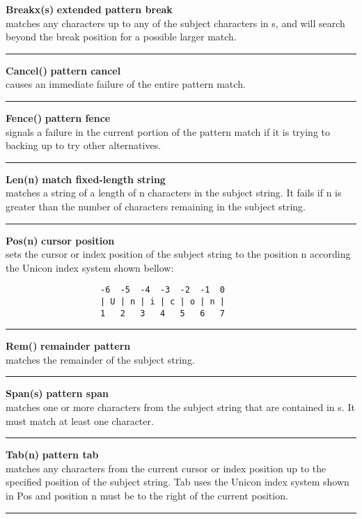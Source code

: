 \documentclass{article}
\begin{document}
\noindent\textbf{Breakx(s)} \hfill\textbf{extended pattern break}\\
matches any characters up to any of the subject characters in s, and will search beyond the break position for a possible larger match.\\
\noindent\rule{14cm}{0.1pt}

\noindent\textbf{Cancel()} \hfill\textbf{pattern cancel}\\
causes an immediate failure of the entire pattern match.\\
\noindent\rule{14cm}{0.1pt}

\noindent\textbf{Fence()} \hfill\textbf{pattern fence}\\
signals a failure in the current portion of the pattern match if it is trying to backing up to try other alternatives.\\
\noindent\rule{14cm}{0.1pt}

\noindent\textbf{Len(n)} \hfill\textbf{match fixed-length string}\\
matches a string of a length of n characters in the subject string.  It fails if n is greater than the number of characters remaining in the subject string.\\
\noindent\rule{14cm}{0.1pt}

\noindent\textbf{Pos(n)} \hfill\textbf{cursor position}\\
sets the cursor or index position of the subject string to the position n according the Unicon index system shown bellow:
\begin{verbatim}
                   -6  -5  -4  -3  -2  -1  0
                   | U | n | i | c | o | n |
                   1   2   3   4   5   6   7
\end{verbatim}
\noindent\rule{14cm}{0.1pt}

\noindent\textbf{Rem()} \hfill\textbf{remainder pattern}\\
matches the remainder of the subject string.\\
\noindent\rule{14cm}{0.1pt}

\noindent\textbf{Span(s)} \hfill\textbf{pattern span}\\
matches one or more characters from the subject string that are contained in s.  It must match at least one character.\\
\noindent\rule{14cm}{0.1pt}

\noindent\textbf{Tab(n)} \hfill\textbf{pattern tab}\\
matches any characters from the current cursor or index position up to the specified position of the subject string. Tab uses the Unicon index system shown in Pos and position n must be to the right of the current position.\\
\noindent\rule{14cm}{0.1pt}
\end{document}
